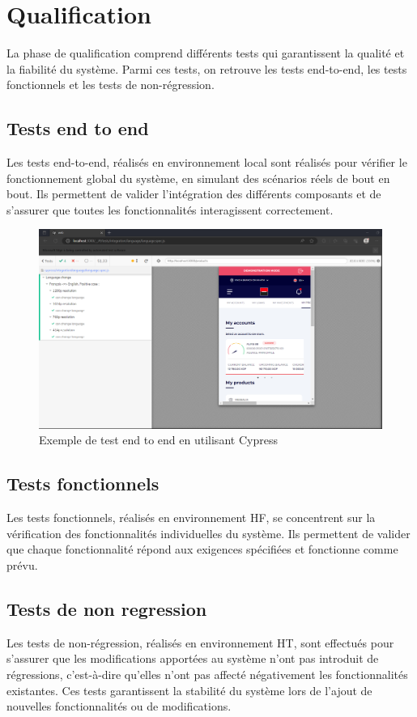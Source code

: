 \section{Qualification}
La phase de qualification comprend différents tests qui garantissent la qualité et la fiabilité du
système. Parmi ces tests, on retrouve les tests end-to-end, les tests fonctionnels et les tests de
non-régression.

\subsection{Tests end to end}
Les tests end-to-end, réalisés en environnement local sont réalisés pour vérifier le fonctionnement
global du système, en simulant des scénarios réels de bout en bout. Ils permettent de valider
l’intégration des différents composants et de s’assurer que toutes les fonctionnalités interagissent
correctement.
\begin{figure}[!h]
    \centering %
        \includegraphics[width=16cm]{images/realisation/cypressLanguage.png}
    \caption{Exemple de test end to end en utilisant Cypress}
\end{figure}
\newpage

\subsection{Tests fonctionnels}
Les tests fonctionnels, réalisés en environnement HF, se concentrent sur la vérification des fonctionnalités individuelles du système. Ils permettent de valider que chaque fonctionnalité répond
aux exigences spécifiées et fonctionne comme prévu.
\subsection{Tests de non regression}
Les tests de non-régression, réalisés en environnement HT, sont effectués pour s’assurer que les
modifications apportées au système n’ont pas introduit de régressions, c’est-à-dire qu’elles n’ont pas affecté négativement les fonctionnalités existantes. Ces tests garantissent la stabilité du système
lors de l’ajout de nouvelles fonctionnalités ou de modifications.

